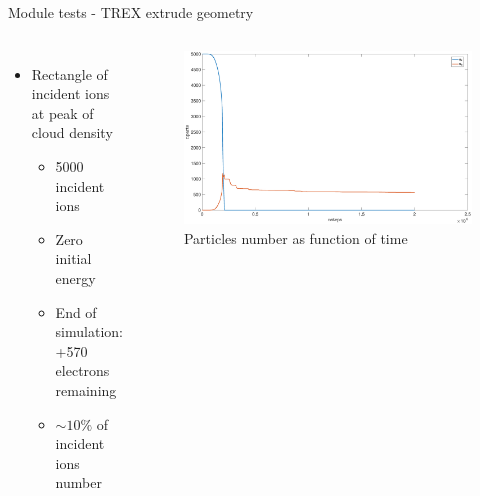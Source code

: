 \documentclass[aspectratio=169,xcolor=dvipsnames,8pt]{beamer}
\begin{document}
  \begin{frame}{Module tests - TREX extrude geometry}
     \begin{columns}[c] %

	\begin{itemize}


		\item{Rectangle of incident ions at peak of cloud density \\
			\begin{itemize}
		
				\item{5000 incident ions}
				\item{Zero initial energy}
				\item{End of simulation: +570 electrons remaining}
				\item{$\sim 10 \%$ of incident ions number}
				\end{itemize}}
				
						
	\end{itemize}

		\begin{figure}[h!]
		\includegraphics[width=1 \textwidth]{nparts_peak_density.eps}
		\caption{\label{img1} Particles number as function of time}
		\end{figure}
     \end{columns}
\end{frame}
\end{document}
